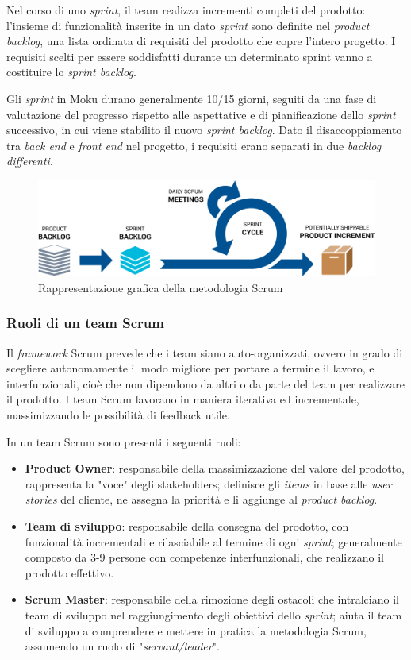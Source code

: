 Nel corso di uno \textit{sprint}, il team realizza incrementi completi del prodotto: l'insieme di funzionalità inserite in un dato \textit{sprint} sono definite nel \textit{product backlog}, una lista ordinata di requisiti del prodotto che copre l'intero progetto. I requisiti scelti per essere soddisfatti durante un determinato sprint vanno a costituire lo \textit{sprint backlog}.

Gli \textit{sprint} in Moku durano generalmente 10/15 giorni, seguiti da una fase di valutazione del progresso rispetto alle aspettative e di pianificazione dello \textit{sprint} successivo, in cui viene stabilito il nuovo \textit{sprint backlog}. Dato il disaccoppiamento tra \textit{back end} e \textit{front end} nel progetto, i requisiti erano separati in due \textit{backlog differenti}.

\begin{figure}[h!]
    \includegraphics[width=\textwidth]{figures/agile-development-process.png}
    \caption[Scrum]{Rappresentazione grafica della metodologia Scrum
    \label{fig:scrum}}
\end{figure}    

\subsubsection{Ruoli di un team Scrum}
\indent Il \textit{framework} Scrum prevede che i team siano auto-organizzati, ovvero in grado di scegliere autonomamente il modo migliore per portare a termine il lavoro, e interfunzionali, cioè che non dipendono da altri o da parte del team per realizzare il prodotto. I team Scrum lavorano in maniera iterativa ed incrementale, massimizzando le possibilità di feedback utile. 

In un team Scrum sono presenti i seguenti ruoli:
\begin{itemize}
    \item \textbf{Product Owner}: responsabile della massimizzazione del valore del prodotto, rappresenta la "voce" degli stakeholders; definisce gli \textit{items} in base alle \textit{user stories} del cliente, ne assegna la priorità e li aggiunge al \textit{product backlog}.
    \item \textbf{Team di sviluppo}: responsabile della consegna del prodotto, con funzionalità incrementali e rilasciabile al termine di ogni \textit{sprint}; generalmente composto da 3-9 persone con competenze interfunzionali, che realizzano il prodotto effettivo.
    \item \textbf{Scrum Master}: responsabile della rimozione degli ostacoli che intralciano il team di sviluppo nel raggiungimento degli obiettivi dello \textit{sprint}; aiuta il team di sviluppo a comprendere e mettere in pratica la metodologia Scrum, assumendo un ruolo di "\textit{servant/leader}".
\end{itemize}

